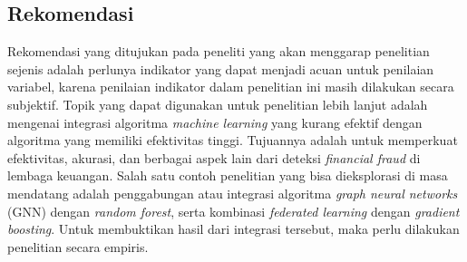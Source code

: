 \documentclass[12pt, a4paper]{article}
\begin{document}
\subsection*{Rekomendasi}
\hspace{1cm}Rekomendasi yang ditujukan pada peneliti yang akan menggarap penelitian sejenis adalah perlunya indikator yang dapat menjadi acuan untuk penilaian variabel, karena penilaian indikator dalam penelitian ini masih dilakukan secara subjektif. 
Topik yang dapat digunakan untuk penelitian lebih lanjut adalah mengenai integrasi algoritma \textit{machine learning} yang kurang efektif dengan algoritma yang memiliki efektivitas tinggi. Tujuannya adalah untuk memperkuat efektivitas, akurasi, dan berbagai aspek lain dari deteksi \textit{financial fraud} di lembaga keuangan. 
Salah satu contoh penelitian yang bisa dieksplorasi di masa mendatang adalah penggabungan atau integrasi algoritma \textit{graph neural networks} (GNN) dengan \textit{random forest}, serta kombinasi \textit{federated learning} dengan \textit{gradient boosting}. Untuk membuktikan hasil dari integrasi tersebut, maka perlu dilakukan penelitian secara empiris.
\end{document}
